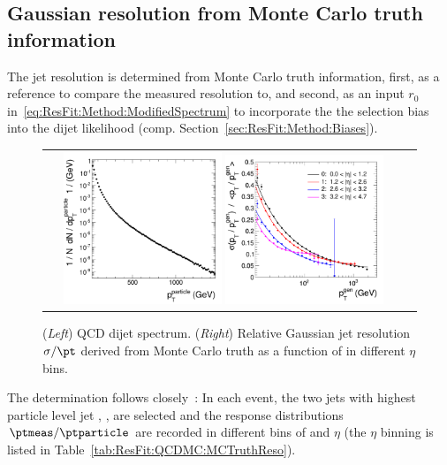\subsection{Gaussian resolution from Monte Carlo truth information}\label{sec:ResFit:QCDMC:MCTruthReso}

The jet \pt resolution is determined from Monte Carlo truth information, first, as a reference to compare the measured resolution to, and second, as an input $r_{0}$ in~\eqref{eq:ResFit:Method:ModifiedSpectrum} to incorporate the the selection bias into the dijet likelihood (comp. Section~\ref{sec:ResFit:Method:Biases}).
\begin{figure}[ht]
  \centering
  \begin{tabular}{cc}
    \includegraphics[width=0.45\textwidth]{figures/resFit_QCD_MCSpectrum}
    \includegraphics[width=0.45\textwidth]{figures/resFit_QCD_MCTruthResolution}
  \end{tabular}
  \caption{(\textit{Left}) QCD dijet \ptparticle spectrum. (\textit{Right}) Relative Gaussian jet \pt resolution $\sigma/\pt$ derived from Monte Carlo truth as a function of \pt in different $\eta$ bins.}
  \label{fig:ResFit:QCDMC:MCTruthReso}
\end{figure}
The determination follows closely~\cite{bib:cmsan:mcjer}:
In each event, the two jets with highest particle level jet \pt, \ptparticle, are selected and the response distributions \mbox{$\ptmeas / \ptparticle$} are recorded in different bins of \ptparticle and $\eta$ (the $\eta$ binning is listed in Table~\ref{tab:ResFit:QCDMC:MCTruthReso}).


